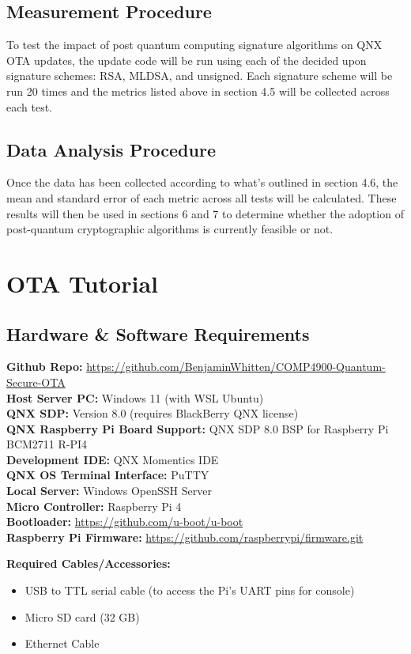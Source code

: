 \documentclass[12pt]{article}
\begin{document}
\subsection{Measurement Procedure}
To test the impact of post quantum computing signature algorithms on QNX OTA updates, the update code will be run using each of the decided upon signature schemes: RSA, MLDSA, and unsigned. Each signature scheme will be run 20 times and the metrics listed above in section 4.5 will be collected across each test.
\subsection{Data Analysis Procedure}
Once the data has been collected according to what's outlined in section 4.6, the mean and standard error of each metric across all tests will be calculated. These results will then be used in sections 6 and 7 to determine whether the adoption of post-quantum cryptographic algorithms is currently feasible or not.
\section{OTA Tutorial}
\subsection{Hardware \& Software Requirements}
\noindent
\textbf{Github Repo:} \url{https://github.com/BenjaminWhitten/COMP4900-Quantum-Secure-OTA} \\
\textbf{Host Server PC:} Windows 11 (with WSL Ubuntu) \\
\textbf{QNX SDP:} Version 8.0 (requires BlackBerry QNX license) \\
\textbf{QNX Raspberry Pi Board Support:} QNX SDP 8.0 BSP for Raspberry Pi BCM2711 R-PI4 \\
\textbf{Development IDE:} QNX Momentics IDE \\
\textbf{QNX OS Terminal Interface:} PuTTY \\
\textbf{Local Server:} Windows OpenSSH Server \\
\textbf{Micro Controller:} Raspberry Pi 4 \\
\textbf{Bootloader:} \url{https://github.com/u-boot/u-boot} \\
\textbf{Raspberry Pi Firmware:} \url{https://github.com/raspberrypi/firmware.git}

\noindent
\textbf{Required Cables/Accessories:}
\begin{itemize}
    \item USB to TTL serial cable (to access the Pi’s UART pins for console)
    \item Micro SD card (32 GB)
    \item Ethernet Cable
\end{itemize}
\end{document}
